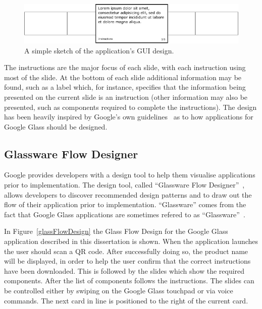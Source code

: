 	\begin{figure}[ht!]
		\centering
		\includegraphics[width=150mm]{images/cardDesign2}
		\caption{A simple sketch of the application's GUI design.}
		\label{cardDesign}
	\end{figure}

The instructions are the major focus of each slide, with each instruction using most of the slide. At the bottom of each slide additional information may be found, such as a label which, for instance, specifies that the information being presented on the current slide is an instruction (other information may also be presented, such as components required to complete the instructions). The design has been heavily inspired by Google's own guidelines~\cite{glassDesignPrinciples} as to how applications for Google Glass should be designed.

\subsection{Glassware Flow Designer}
Google provides developers with a design tool to help them visualise applications prior to implementation. The design tool, called ``Glassware Flow Designer''~\cite{glasswareFlowDesigner}, allows developers to discover recommended design patterns and to draw out the flow of their application prior to implementation. ``Glassware'' comes from the fact that Google Glass applications are sometimes refered to as ``Glassware''~\cite{glassware}.

In Figure~\ref{glassFlowDesign} the Glass Flow Design for the Google Glass application described in this dissertation is shown. When the application launches the user should scan a QR code. After successfully doing so, the product name will be displayed, in order to help the user confirm that the correct instructions have been downloaded. This is followed by the slides which show the required components. After the list of components follows the instructions. The slides can be controlled either by swiping on the Google Glass touchpad or via voice commands. The next card in line is positioned to the right of the current card.

